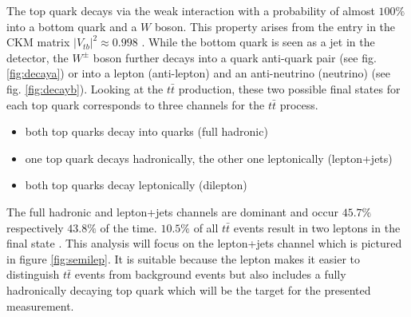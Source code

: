 	The top quark decays via the weak interaction with a probability of almost $100\%$ into a bottom quark and a $W$ boson. This property arises from the entry in the CKM matrix $|V_{tb}|^2 \approx 0.998$ \cite{pdg2016}. While the bottom quark is seen as a jet in the detector, the $W^\pm$ boson further decays into a quark anti-quark pair (see fig. \ref{fig:decaya}) or into a lepton (anti-lepton) and an anti-neutrino (neutrino) (see fig. \ref{fig:decayb}). Looking at the $t\bar{t}$ production, these two possible final states for each top quark corresponds to three channels for the $t\bar{t}$ process. 
	\begin{itemize}
	\item both top quarks decay into quarks (full hadronic)
	\item one top quark decays hadronically, the other one leptonically (lepton+jets)
	\item both top quarks decay leptonically (dilepton)
	\end{itemize}
	The full hadronic and lepton+jets channels are dominant and occur $45.7\%$ respectively $43.8\%$ of the time. $10.5\%$ of all $t\bar{t}$ events result in two leptons in the final state \cite{pdg2016}. This analysis will focus on the lepton+jets channel which is pictured in figure \ref{fig:semilep}. It is suitable because the lepton makes it easier to distinguish $t\bar{t}$ events from background events but also includes a fully hadronically decaying top quark which will be the target for the presented measurement.
	
		
